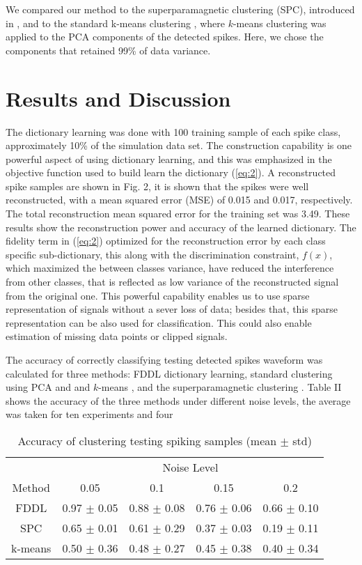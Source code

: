 \documentclass[conference]{IEEEtran}
\begin{document}
	We compared our method to the superparamagnetic clustering (SPC), introduced in \cite{quiroga2004unsupervised}, and to the standard k-means clustering \cite{lewicki1998review}, where $k$-means clustering was applied to the PCA components of the detected spikes. Here, we chose the components that retained 99\% of data variance.
	
 	\section{Results and Discussion}
	The dictionary learning was done with 100 training sample of each spike class, approximately 10\% of the simulation data set. The construction capability is one powerful aspect of using dictionary learning, and this was emphasized in the objective function used to build learn the dictionary (\ref{eq:2}). A reconstructed spike samples are shown in Fig. 2, it is shown that the spikes were well reconstructed, with a mean squared error (MSE) of 0.015 and 0.017, respectively. The total reconstruction mean squared error for the training set was 3.49. These results show the reconstruction power and accuracy of the learned dictionary. The fidelity term in (\ref{eq:2}) optimized for the reconstruction error by each class specific sub-dictionary, this along with the discrimination constraint, $f(x)$, which maximized the between classes variance, have reduced the interference from other classes, that is reflected as low variance of the reconstructed signal from the original one. This powerful capability enables us to use sparse representation of signals without a sever loss of data; besides that, this sparse representation can be also used for classification. This could also enable estimation of missing data points or clipped signals.
	
	The accuracy of correctly classifying testing detected spikes waveform was calculated for three methods: FDDL dictionary learning, standard clustering using PCA and and $k$-means \cite{lewicki1998review}, and the superparamagnetic clustering \cite{quiroga2004unsupervised}. Table II shows the accuracy of the three methods under different noise levels, the average was taken for ten experiments and four
	
	\begin{table}
		\caption{Accuracy of clustering testing spiking samples (mean $\pm$ std)}
		\label{tab:acc_clust}
		\begin{tabularx}{\columnwidth}{c c c c c}
			\cmidrule{2-5}
			& \multicolumn{4}{c}{Noise Level} \\
			\cmidrule{2-5}
			Method & 0.05 & 0.1 & 0.15 & 0.2 \\
			\cmidrule[0.7pt]{1-5}
			FDDL & 0.97 $\pm$ 0.05 & 0.88 $\pm$ 0.08 & 0.76 $\pm$ 0.06 & 0.66 $\pm$ 0.10 \\
			SPC & 0.65 $\pm$ 0.01 & 0.61 $\pm$ 0.29 & 0.37 $\pm$ 0.03 & 0.19 $\pm$ 0.11 \\
			k-means & 0.50 $\pm$ 0.36 & 0.48 $\pm$ 0.27 & 0.45 $\pm$ 0.38 & 0.40 $\pm$ 0.34 \\
			\cmidrule[0.7pt]{1-5}
		\end{tabularx}
	\end{table}
\end{document}
